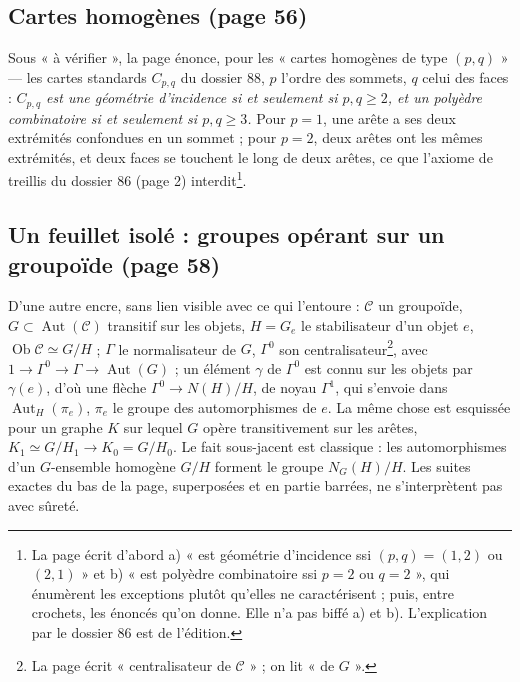 \documentclass[11pt,a4paper]{article}
\begin{document}
\subsection*{Cartes homogènes (page 56)}

Sous « à vérifier », la page énonce, pour les « cartes homogènes de type $(p,
q)$ » --- les cartes standards $C_{p,q}$ du dossier 88, $p$ l'ordre des
sommets, $q$ celui des faces : \emph{$C_{p,q}$ est une géométrie d'incidence si
et seulement si $p, q \geq 2$, et un polyèdre combinatoire si et seulement si
$p, q \geq 3$.} Pour $p = 1$, une arête a ses deux extrémités confondues en
un sommet ; pour $p = 2$, deux arêtes ont les mêmes extrémités, et deux faces se
touchent le long de deux arêtes, ce que l'axiome de treillis du dossier 86
(page 2) interdit\footnote{La page écrit d'abord a) « est géométrie
d'incidence ssi $(p, q) = (1, 2)$ ou $(2, 1)$ » et b) « est polyèdre
combinatoire ssi $p = 2$ ou $q = 2$ », qui énumèrent les exceptions plutôt
qu'elles ne caractérisent ; puis, entre crochets, les énoncés qu'on donne. Elle
n'a pas biffé a) et b). L'explication par le dossier 86 est de l'édition.}.

\subsection*{Un feuillet isolé : groupes opérant sur un groupoïde (page 58)}

D'une autre encre, sans lien visible avec ce qui l'entoure : $\mathcal{C}$ un
groupoïde, $G \subset \operatorname{Aut}(\mathcal{C})$ transitif sur les objets,
$H = G_e$ le stabilisateur d'un objet $e$, $\operatorname{Ob}\mathcal{C} \simeq
G / H$ ; $\Gamma$ le normalisateur de $G$, $\Gamma^0$ son
centralisateur\footnote{La page écrit « centralisateur de $\mathcal{C}$ » ; on
lit « de $G$ ».}, avec $1 \to \Gamma^0 \to \Gamma \to \operatorname{Aut}(G)$ ;
un élément $\gamma$ de $\Gamma^0$ est connu sur les objets par $\gamma(e)$, d'où
une flèche $\Gamma^0 \to N(H)/H$, de noyau $\Gamma^1$, qui s'envoie dans
$\operatorname{Aut}_H(\pi_e)$, $\pi_e$ le groupe des automorphismes de $e$. La
même chose est esquissée pour un graphe $K$ sur lequel $G$ opère
transitivement sur les arêtes, $K_1 \simeq G / H_1 \to K_0 = G / H_0$. Le fait
sous-jacent est classique : les automorphismes d'un $G$-ensemble homogène $G/H$
forment le groupe $N_G(H)/H$. Les suites exactes du bas de la page, superposées
et en partie barrées, ne s'interprètent pas avec sûreté.

\end{document}
